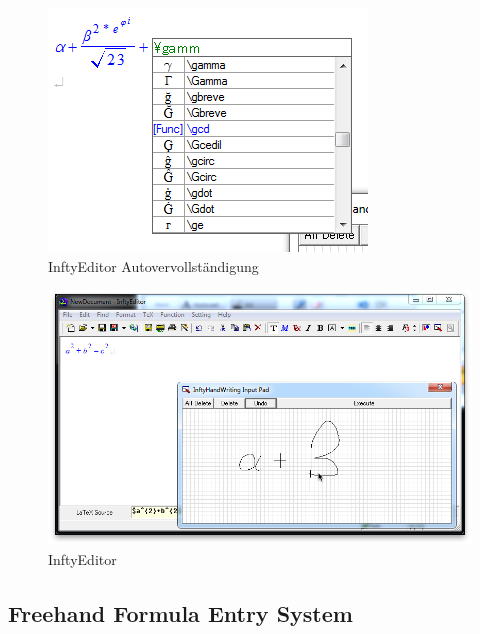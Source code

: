 \begin{figure}
  \begin{center}
    \includegraphics[width=\textwidth]{figures/inftyeditor-autocomplete.png}
  \end{center}
  \caption{InftyEditor Autovervollständigung}
  \label{fig:inftyeditor-autocomplete}
\end{figure}

\begin{figure}
  \begin{center}
    \includegraphics[width=\textwidth]{figures/inftyeditor.png}
  \end{center}
  \caption{InftyEditor}
  \label{fig:inftyeditor}
\end{figure}


\subsection{Freehand Formula Entry System}

